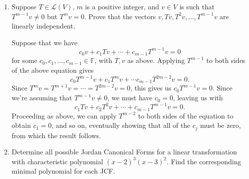 \documentclass[letterpaper,12pt]{article}
\renewcommand{\L}{\mathcal{L}}
\begin{document}
\begin{enumerate}
{\bf Note:} Using results from Chapter 8, we could also argue as follows:

Since $T^9=T^8$, we have $T^9-T^8 = T^8(T-I)=0$. Thus, $p(T)=0$, where $p(z)=z^8(z-1)$, which implies that $p(z)$ is a multiple of the minimal polynomial of $T$, and thus the only possible eigenvalues of $T$ are 0 and 1.

\bigskip

\item Suppose $T\in \L(V)$, $m$ is a positive integer, and $v\in V$ is such that $T^{m-1}v\neq 0$ but $T^mv=0$. Prove that the vectors $v, Tv, T^2v,\ldots, T^{m-1}v$ are linearly independent.

\bigskip

Suppose that we have
\[
 c_0v+c_1Tv+\cdots + c_{m-1}T^{m-1}v=0
\]
for some $c_0,c_1,\ldots, c_{m-1}\in\mathbb{F}$, with $T,v$ as above. Applying $T^{m-1}$ to both sides of the above equation gives
\[
 c_0T^{m-1}v+c_1T^mv+\cdots c_{m-1}T^{2m-2}v=0.
\]
Since $T^mv=T^{m+1}v=\cdots =T^{2m-2}v=0$, this gives us $c_0T^{m-1}v=0$. Since we're assuming that $T^{m-1}v\neq 0$, we must have $c_0=0$, leaving us with
\[
 c_1Tv + c_2T^2v+\cdots + c_{m-1}T^{m-1}v=0.
\]
Proceeding as above, we can apply $T^{m-2}$ to both sides of the equation to obtain $c_1=0$, and so on, eventually showing that all of the $c_j$ must be zero, from which the result follows.

\bigskip

\item Determine all possible Jordan Canonical Forms for a linear transformation with characteristic polynomial $(x-2)^3(x-3)^2$. Find the corresponding minimal polynomial for each JCF.

\bigskip


\end{enumerate}
\end{document}
